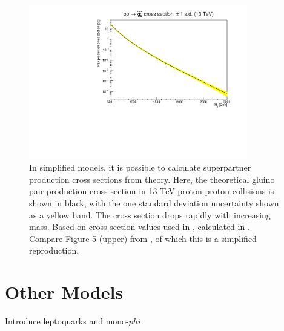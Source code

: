   \begin{figure}[h!]
    \centering
    \includegraphics[width=0.85\textwidth]{figures/gluino_xsec.pdf}
    \caption[Theoretical gluino pair production cross section in simplified models.]{In simplified models, it is possible to calculate superpartner production cross sections from theory.
Here, the theoretical gluino pair production cross section in 13 TeV proton-proton collisions is shown in black, with the one standard deviation uncertainty shown as a yellow band.
The cross section drops rapidly with increasing mass.
Based on cross section values used in \cite{MT2_2019}, calculated in \cite{SUSYxsecs}.
Compare Figure 5 (upper) from \cite{SUSYxsecs}, of which this is a simplified reproduction.
}
    \label{fig:SUSYxsec}
  \end{figure}  

\section{Other Models} \label{sec:othermodels}

Introduce leptoquarks and mono-$phi$.

